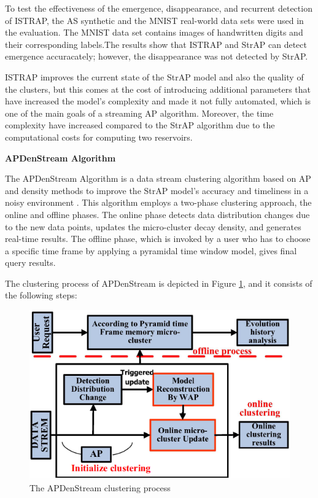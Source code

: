
To test the effectiveness of the emergence, disappearance, and recurrent detection of ISTRAP, the AS synthetic and the MNIST real-world data sets were used in the evaluation. The MNIST data set contains images of handwritten digits and their corresponding labels.The results show that ISTRAP and StrAP can detect emergence accuracately; however, the disappearance was not detected by StrAP.

ISTRAP improves the current state of the StrAP model and also the quality of the clusters, but this comes at the cost of introducing additional parameters that have increased the model's complexity and made it not fully automated, which is one of the main goals of a streaming AP algorithm. Moreover, the time complexity have increased compared to the StrAP algorithm due to the computational costs for computing two reservoirs. 





\vspace{7mm}
\hspace{-1 cm}
\textbf{APDenStream Algorithm}

The APDenStream Algorithm is a data stream clustering algorithm based on AP and density methods to improve the StrAP model's accuracy and timeliness in a noisy environment \cite{zhang2013online}. This algorithm employs a two-phase clustering approach, the online and offline phases. The online phase detects data distribution changes due to the new data points, updates the micro-cluster decay density, and generates real-time results. The offline phase, which is invoked by a user who has to choose a specific time frame by applying a pyramidal time window model, gives final query results. 

The clustering process of APDenStream is depicted in Figure \ref{APden}, and it consists of the following steps: 


\begin{figure}[ht]
\centering
\includegraphics[width = 10 cm]{image/Chapters/Chapter3/APDenstream.PNG}
\caption{The APDenStream clustering process}
\label{APden}
\end{figure}


